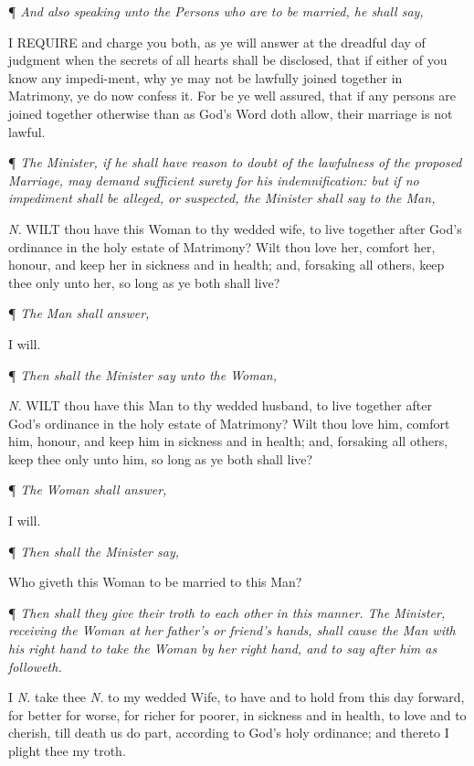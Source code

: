 ¶
\emph{And also speaking unto the Persons who are to be married, he shall
say,}

I
REQUIRE and charge you both, as ye will answer at the dreadful day of
judgment when the secrets of all hearts shall be disclosed, that if either
of you know any impedi-ment, why ye may not be lawfully joined together
in Matrimony, ye do now confess it. For be ye well assured, that if any
persons are joined together otherwise than as God’s Word doth allow,
their marriage is not lawful.

¶
\emph{The Minister, if he shall have reason to doubt of the lawfulness of
the proposed Marriage, may demand sufficient surety for his indemnification:
but if no impediment shall be alleged, or suspected, the Minister shall
say to the Man,}

\emph{N.}
WILT thou have this Woman to thy wedded wife, to live together after God’s
ordinance in the holy estate of Matrimony? Wilt thou love her, comfort
her, honour, and keep her in sickness and in health; and, forsaking all
others, keep thee only unto her, so long as ye both shall live?

¶
\emph{The Man shall answer,}

I will.

¶
\emph{Then shall the Minister say unto the Woman,}

\emph{N.}
WILT thou have this Man to thy wedded husband, to live together after
God’s ordinance in the holy estate of Matrimony? Wilt thou love
him, comfort him, honour, and keep him in sickness and in health; and,
forsaking all others, keep thee only unto him, so long as ye both shall
live?

¶
\emph{The Woman shall answer,}

I will.

¶
\emph{Then shall the Minister say,}

Who giveth this
Woman to be married to this Man?

¶
\emph{Then shall they give their troth to each other in this manner. The
Minister, receiving the Woman at her father's or friend's hands, shall
cause the Man with his right hand to take the Woman by her right hand,
and to say after him as followeth.}

I
\emph{N.} take thee \emph{N.} to my wedded Wife, to have and to hold
from this day forward, for better for worse, for richer for poorer, in
sickness and in health, to love and to cherish, till death us do part,
according to God's holy ordinance; and thereto I plight thee my troth.

